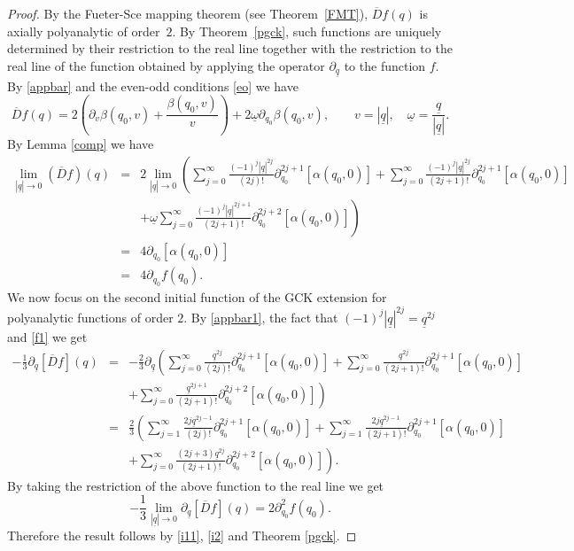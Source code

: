 \documentclass[reqno,11pt]{amsart}
\numberwithin{equation}{section}
\theoremstyle{definition}
\begin{document}
\begin{proof}
By the Fueter-Sce mapping theorem (see Theorem~\ref{FMT}), $\overline{D} f(q)$ is axially polyanalytic of order~$2$. By Theorem~\ref{pgck}, such functions are uniquely determined by their restriction to the real line together with the restriction to the real line of the function obtained by applying the operator $\partial_{\underline{q}}$ to the function $f$. By \eqref{appbar} and the even-odd conditions \eqref{eo} we have
\begin{equation}
\label{appbar1}
\overline{D}f(q)= 2 \left( \partial_{v} \beta(q_0,v)+\frac{\beta(q_0,v)}{v} \right)+2 \underline{\omega} \partial_{q_0} \beta(q_0,v), \qquad v=|\underline{q}|, \quad  \underline{\omega}=\frac{\underline{q}}{|\underline{q}|}.
\end{equation}
By Lemma \ref{comp} we have
\begin{eqnarray}
	\nonumber
\lim_{|\underline{q}| \to 0} (\overline{D}f)(q)&=&2 \lim_{|\underline{q}| \to 0} \left(\sum_{j=0}^\infty \frac{(-1)^j|\underline{q}|^{2j}}{(2j)!} \partial_{q_0}^{2j+1}[\alpha(q_0,0)]+ \sum_{j=0}^\infty \frac{(-1)^j |\underline{q}|^{2j}}{(2j+1)!} \partial_{q_0}^{2j+1}[\alpha(q_0,0)]\right.\\
\nonumber
&& \left.+ \underline{\omega} \sum_{j=0}^\infty \frac{(-1)^j |\underline{q}|^{2j+1}}{(2j+1)!} \partial_{q_0}^{2j+2}[\alpha(q_0,0)] \right)\\
\nonumber
&=& 4 \partial_{q_0}[\alpha(q_0,0)]\\
\label{i11}
&=& 4\partial_{q_0} f(q_0).
\end{eqnarray}
We now focus on the second initial function of the GCK extension for polyanalytic functions of order $2$. By \eqref{appbar1}, the fact that $(-1)^j | \underline{q}|^{2j}=\underline{q}^{2j}$ and \eqref{f1} we get
\begin{eqnarray*}
- \frac{1}{3} \partial_{\underline{q}} [\overline{D}f](q)&=&-\frac{2}{3} \partial_{\underline{q}} \left( \sum_{j=0}^\infty \frac{\underline{q}^{2j}}{(2j)!} \partial_{q_0}^{2j+1}[\alpha(q_0,0)]+ \sum_{j=0}^\infty  \frac{\underline{q}^{2j}}{(2j+1)!} \partial_{q_0}^{2j+1}[\alpha(q_0,0)] \right.\\
&& \left.+ \sum_{j=0}^\infty \frac{\underline{q}^{2j+1}}{(2j+1)!} \partial_{q_0}^{2j+2}[\alpha(q_0,0)]\right)\\
&=& \frac{2}{3} \left( \sum_{j=1}^\infty \frac{2j \underline{q}^{2j-1}}{(2j)!} \partial_{q_0}^{2j+1}[\alpha(q_0,0)]+ \sum_{j=1}^\infty \frac{2j \underline{q}^{2j-1}}{(2j+1)!} \partial_{q_0}^{2j+1}[\alpha(q_0,0)] \right.\\
&& \left.+ \sum_{j=0}^\infty \frac{(2j+3) \underline{q}^{2j}}{(2j+1)!} \partial_{q_0}^{2j+2}[\alpha(q_0,0)]  \right).
\end{eqnarray*}
By taking the restriction of the above function to the real line we get
\begin{equation}
\label{i2}
- \frac{1}{3} \lim_{|\underline{q}| \to 0} \partial_{\underline{q}} [\overline{D}f](q)=2\partial_{q_0}^2 f(q_0).
\end{equation}
Therefore the result follows by \eqref{i11}, \eqref{i2} and Theorem \ref{pgck}.
\end{proof}
\end{document}
